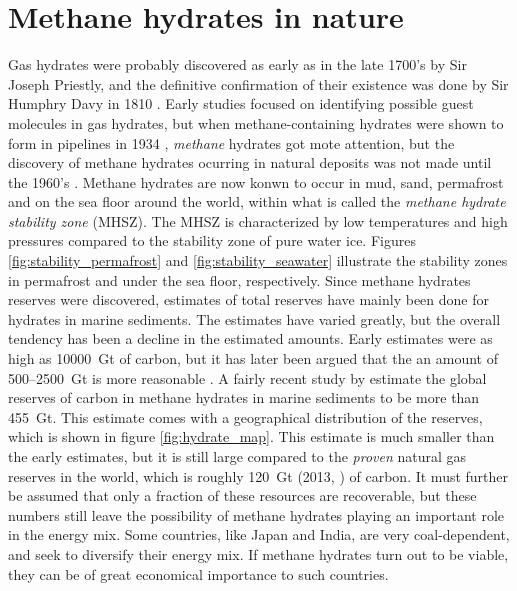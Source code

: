 \section{Methane hydrates in nature}
Gas hydrates were probably discovered as early as in the late 1700's by Sir Joseph Priestly, and the definitive confirmation of their existence was done by Sir Humphry Davy in 1810 \cite{Hester2009}. Early studies focused on identifying possible guest molecules in gas hydrates, but when methane-containing hydrates were shown to form in pipelines in 1934 \cite{Hammerschmidt1934}, \emph{methane} hydrates got mote attention, but the discovery of methane hydrates ocurring in natural deposits was not made until the 1960's \cite{Makogon200714}. Methane hydrates are now konwn to occur in mud, sand, permafrost and on the sea floor around the world, within what is called the \emph{methane hydrate stability zone} (MHSZ). The MHSZ is characterized by low temperatures and high pressures compared to the stability zone of pure water ice. Figures \ref{fig:stability_permafrost} and \ref{fig:stability_seawater} illustrate the stability zones in permafrost and under the sea floor, respectively.  Since methane hydrates reserves were discovered, estimates of total reserves have mainly been done for hydrates in marine sediments. The estimates have varied greatly, but the overall tendency has been a decline in the estimated amounts. Early estimates were as high as \SI{10000}{\giga\tonne} of carbon, but it has later been argued that the an amount of 500–\SI{2500}{\giga\tonne} is more reasonable \cite{Milkov2004183}. A fairly recent study by \citet{Wallmann2012} estimate the global reserves of carbon in methane hydrates in marine sediments to be more than \SI{455}{\giga\tonne}. This estimate comes with a geographical distribution of the reserves, which is shown in figure \ref{fig:hydrate_map}. This estimate is much smaller than the early estimates, but it is still large compared to the \emph{proven} natural gas reserves in the world, which is roughly \SI{120}{\giga\tonne} (2013, \cite{CIA2013}) of carbon. It must further be assumed that only a fraction of these resources are recoverable, but these numbers still leave the possibility of methane hydrates playing an important role in the energy mix. Some countries, like Japan and India, are very coal-dependent, and seek to diversify their energy mix. If methane hydrates turn out to be viable, they can be of great economical importance to such countries. 
